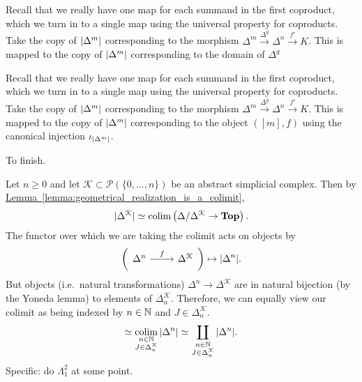 \documentclass[main.tex]{subfiles}
\begin{document}
Recall that we really have one map for each summand in the first coproduct, which we turn in to a single map using the universal property for coproducts. Take the copy of ${| \Delta^{m} |}$ corresponding to the morphism $\Delta^{m} \overset{\Delta^{g}}{\to} \Delta^{n} \overset{f'}{\to} K$. This is mapped to the copy of ${| \Delta^{m} |}$ corresponding to the domain of $\Delta^{g}$

Recall that we really have one map for each summand in the first coproduct, which we turn in to a single map using the universal property for coproducts. Take the copy of ${| \Delta^{m} |}$ corresponding to the morphism $\Delta^{m} \overset{\Delta^{g}}{\to} \Delta^{n} \overset{f'}{\to} K$. This is mapped to the copy of ${| \Delta^{m} |}$ corresponding to the object $([m], f)$ using the canonical injection $\iota_{{| \Delta^{m} |}}$.

To finish.

\begin{example}
  Let $n \geq 0$ and let $\mathcal{K} \subset \mathcal{P}(\{0, \ldots, n\})$ be an abstract simplicial complex. Then by \hyperref[lemma:geometrical_realization_is_a_colimit]{Lemma~\ref*{lemma:geometrical_realization_is_a_colimit}},
  \begin{equation*}
    |\Delta^{\mathcal{K}}| \simeq \operatorname*{colim}\left( \Delta/\Delta^{\mathcal{K}} \to \mathbf{Top} \right).
  \end{equation*}
  The functor over which we are taking the colimit acts on objects by
  \begin{equation*}
    \left( \begin{tikzcd} \Delta^{n} \arrow[r, "f"] & \Delta^{\mathcal{K}} \end{tikzcd} \right) \mapsto \abs{\Delta^{n}}.
  \end{equation*}
  But objects (i.e.\ natural transformations) $\Delta^{n} \to \Delta^{\mathcal{K}}$ are in natural bijection (by the Yoneda lemma) to elements of $\Delta^{\mathcal{K}}_{n}$. Therefore, we can equally view our colimit as being indexed by $n \in \mathbb{N}$ and $J \in \Delta^{\mathcal{K}}_{n}$.
  \begin{equation*}
    \simeq \operatorname*{colim}_{\substack{n \in \mathbb{N} \\ J \in \Delta^{\mathcal{K}}_{n}}} {| \Delta^{n} |} \simeq \coprod_{\substack{n \in \mathbb{N} \\ J \in \Delta^{\mathcal{K}}_{n}}} {| \Delta^{n} |}.
  \end{equation*}
  Specific: do $\Lambda^{2}_{1}$ at some point.
\end{example}
\end{document}

